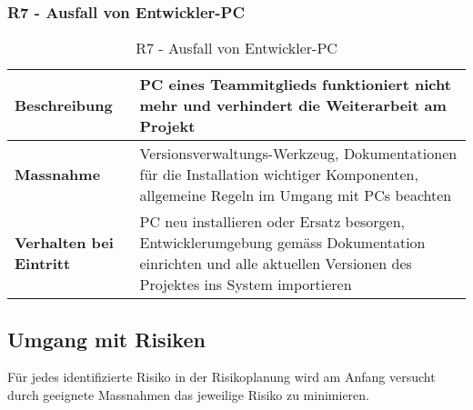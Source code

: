 \subsubsection{R7 - Ausfall von Entwickler-PC}
\begin{table}[H]
    \centering
    \def\arraystretch{2}
    \begin{tabular}{| p{4.5cm} | p{13.5cm} |} \hline
        \textbf{Beschreibung} & PC eines Teammitglieds funktioniert nicht mehr und verhindert die Weiterarbeit am Projekt \\ \hline
        \textbf{Massnahme} & Versionsverwaltungs-Werkzeug, Dokumentationen für die Installation wichtiger Komponenten, allgemeine Regeln im Umgang mit PCs beachten\\ \hline
        \textbf{Verhalten bei Eintritt} & PC neu installieren oder Ersatz besorgen, Entwicklerumgebung gemäss Dokumentation einrichten und alle aktuellen Versionen des Projektes ins System importieren \\ \hline 
    \end{tabular}
    \caption{R7 - Ausfall von Entwickler-PC}
\end{table}

\subsection{Umgang mit Risiken}
Für jedes identifizierte Risiko in der Risikoplanung wird am Anfang versucht durch geeignete Massnahmen das jeweilige Risiko zu minimieren.
